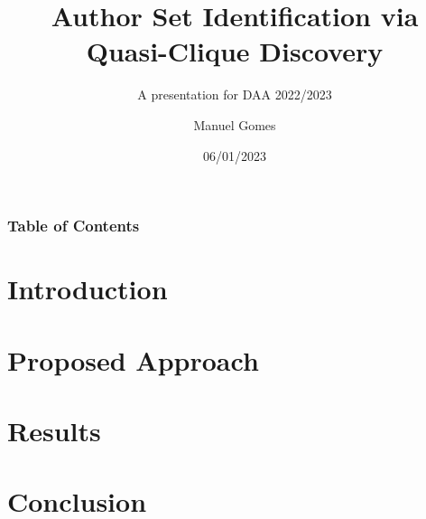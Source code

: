 \documentclass[10pt,xcolor={dvipsnames}]{beamer}
\title[]
{Author Set Identification via Quasi-Clique Discovery}
\subtitle{A presentation for DAA 2022/2023}
\author[Manuel Alberto Silva Gomes] %
{Manuel Gomes}
\date[2023/01/06] %
{06/01/2023}
\begin{document}
\frame{\titlepage}


\begin{frame}
\frametitle{Table of Contents}
\tableofcontents
\end{frame}

\section{Introduction}

% 
\section{Proposed Approach}

\section{Results}

\section{Conclusion}



\end{document}
